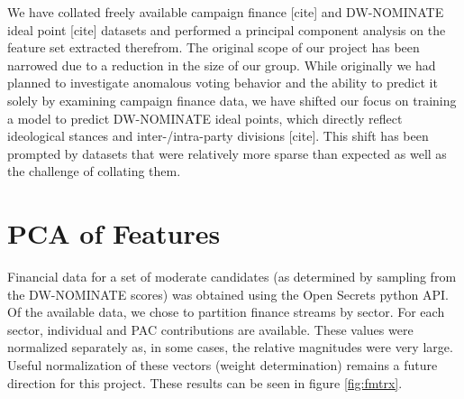 \documentclass[10]{article}
\begin{document}
We have collated freely available campaign finance [cite] and DW-NOMINATE ideal point [cite] datasets and performed a principal component analysis on the feature set extracted therefrom. The original scope of our project has been narrowed due to a reduction in the size of our group. While originally we had planned to investigate anomalous voting behavior and the ability to predict it solely by examining campaign finance data, we have shifted our focus on training a model to predict DW-NOMINATE ideal points, which directly reflect ideological stances and inter-/intra-party divisions [cite]. This shift has been prompted by datasets that were relatively more sparse than expected as well as the challenge of collating them.\\

\section*{PCA of Features}
Financial data for a set of moderate candidates (as determined by sampling from the DW-NOMINATE scores) was obtained using the Open Secrets python API.  Of the available data, we chose to partition finance streams by sector.  For each sector, individual and PAC contributions are available.  These values were normalized separately as, in some cases, the relative magnitudes were very large.  Useful normalization of these vectors (weight determination) remains a future direction for this project.  These results can be seen in figure \ref{fig:fmtrx}.
\end{document}
